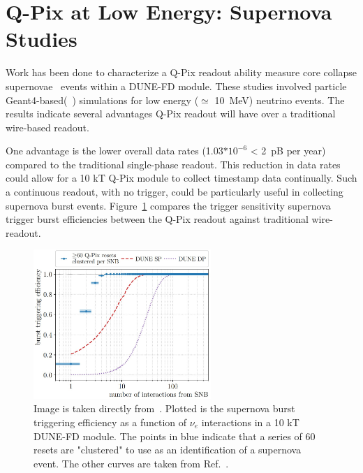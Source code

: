 \section{Q-Pix at Low Energy: Supernova Studies}
\label{sec:qpix_supernova}
Work has been done to characterize a Q-Pix readout ability measure core collapse supernovae~\citep{qpix:shion} events within a DUNE-FD module.
These studies involved particle Geant4-based(~\citep{geant4:AGOSTINELLI2003250}) simulations for low energy ($\simeq$ 10~\unit{MeV}) neutrino events.
The results indicate several advantages Q-Pix readout will have over a traditional wire-based readout.

One advantage is the lower overall data rates (1.03$*10^{-6}$ < 2~\unit{pB} per year) compared to the traditional single-phase readout.
This reduction in data rates could allow for a 10 kT Q-Pix module to collect timestamp data continually.
Such a continuous readout, with no trigger, could be particularly useful in collecting supernova burst events.
Figure~\ref{fig:qpix_shion} compares the trigger sensitivity supernova trigger burst efficiencies between the Q-Pix readout against traditional wire-readout. 

\begin{figure}[]
\centering
\includegraphics[width=0.6\textwidth]{images/shion_qpix_snb_trigger.jpg}
\caption{Image is taken directly from~\citep{qpix:shion}.
Plotted is the supernova burst triggering efficiency as a function of $\nu_{e}$ interactions in a 10 kT DUNE-FD module.
The points in blue indicate that a series of 60 resets are "clustered" to use as an identification of a supernova event. 
The other curves are taken from Ref.~\citep{supernova_Abi_2021}.
}
\label{fig:qpix_shion}
\end{figure}